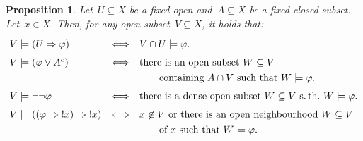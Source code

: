 \documentclass[10pt,reqno,a4paper]{amsbook}
\theoremstyle{definition}
\theoremstyle{plain}
\newtheorem{prop}[defn]{Proposition}
\theoremstyle{remark}
\newcommand{\?}{\,{:}\,}
\renewcommand{\_}{\mathpunct{.}\,}
\newcommand{\notat}[1]{{!#1}}
\begin{document}
\begin{prop}\label{prop:modops-kripke}
Let~$U \subseteq X$ be a fixed open and~$A \subseteq X$ be a fixed
closed subset. Let~$x \in X$. Then, for any open subset~$V \subseteq X$, it
holds that:
\[ \renewcommand{\arraystretch}{1.3}\begin{array}{@{}lcl@{}}
  V \models (U \Rightarrow \varphi) &\Longleftrightarrow&
    V \cap U \models \varphi. \\[0.3em]
  V \models (\varphi \vee A^c) &\Longleftrightarrow&
    \textnormal{there is an open subset~$W \subseteq V$} \\
  && \quad\quad \textnormal{containing~$A \cap V$ such that $W \models \varphi$.} \\[0.3em]
  V \models \neg\neg\varphi &\Longleftrightarrow&
    \textnormal{there is a dense open subset~$W \subseteq V$ s.\,th.\@ $W \models
    \varphi$.} \\[0.3em]
  V \models ((\varphi \Rightarrow \notat{x}) \Rightarrow \notat{x}) &\Longleftrightarrow&
    \textnormal{$x \not\in V$ or there is an open neighbourhood~$W \subseteq V$} \\
  && \quad\quad \textnormal{of~$x$ such that $W \models \varphi$.}
\end{array} \]
\end{prop}
\end{document}
